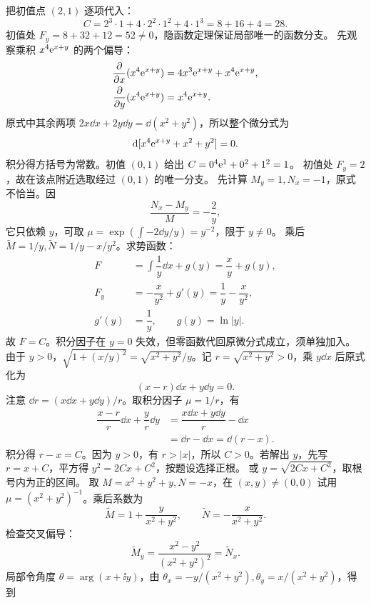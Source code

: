 把初值点 $(2,1)$ 逐项代入：
\[
C=2^3\cdot1+4\cdot2^2\cdot1^2+4\cdot1^3=8+16+4=28.
\]
初值处 $F_y=8+32+12=52\ne0$，隐函数定理保证局部唯一的函数分支。
先观察乘积 $x^4\mathrm e^{x+y}$ 的两个偏导：
\[
\begin{aligned}
\dfrac\partial{\partial x}(x^4\mathrm e^{x+y})&=4x^3\mathrm e^{x+y}+x^4\mathrm e^{x+y},\\
\dfrac\partial{\partial y}(x^4\mathrm e^{x+y})&=x^4\mathrm e^{x+y}.
\end{aligned}
\]
原式中其余两项 $2x\dd x+2y\dd y=\dd(x^2+y^2)$，所以整个微分式为
\[
\mathrm d[x^4\mathrm e^{x+y}+x^2+y^2]=0.
\]
积分得方括号为常数。初值 $(0,1)$ 给出 $C=0^4\mathrm e^1+0^2+1^2=1$。
初值处 $F_y=2$，故在该点附近选取经过 $(0,1)$ 的唯一分支。
先计算 $M_y=1,N_x=-1$，原式不恰当。因
\[
\dfrac{N_x-M_y}{M}=-\dfrac2y,
\]
它只依赖 $y$，可取 $\displaystyle \mu=\exp(\int-2\dd y/y)=y^{-2}$，限于 $y\ne0$。
乘后 $\widetilde M=1/y,\widetilde N=1/y-x/y^2$。求势函数：
\[
\begin{aligned}
F&=\int\dfrac1y\dd x+g(y)=\dfrac xy+g(y),\\
F_y&=-\dfrac{x}{y^2}+g'(y)=\dfrac1y-\dfrac{x}{y^2},\\
g'(y)&=\dfrac1y,\qquad g(y)=\ln|y|.
\end{aligned}
\]
故 $F=C$。积分因子在 $y=0$ 失效，但零函数代回原微分式成立，须单独加入。
由于 $y>0$，$\sqrt{1+(x/y)^2}=\sqrt{x^2+y^2}/y$。记 $r=\sqrt{x^2+y^2}>0$，乘 $y\dd x$ 后原式化为
\[
(x-r)\dd x+y\dd y=0.
\]
注意 $\dd r=(x\dd x+y\dd y)/r$。取积分因子 $\mu=1/r$，有
\[
\begin{aligned}
\dfrac{x-r}{r}\dd x+\dfrac yr\dd y
 &=\dfrac{x\dd x+y\dd y}{r}-\dd x\\
 &=\dd r-\dd x=\dd(r-x).
\end{aligned}
\]
积分得 $r-x=C$。因为 $y>0$，有 $r>|x|$，所以 $C>0$。若解出 $y$，先写 $r=x+C$，平方得 $y^2=2Cx+C^2$，按题设选择正根。
或 $y=\sqrt{2Cx+C^2}$，取根号内为正的区间。
取 $M=x^2+y^2+y,N=-x$，在 $(x,y)\ne(0,0)$ 试用 $\mu=(x^2+y^2)^{-1}$。乘后系数为
\[
\widetilde M=1+\dfrac y{x^2+y^2},\qquad
\widetilde N=-\dfrac x{x^2+y^2}.
\]
检查交叉偏导：
\[
\widetilde M_y=\dfrac{x^2-y^2}{(x^2+y^2)^2}
=\widetilde N_x.
\]
局部令角度 $\theta=\arg(x+\ii y)$，由 $\theta_x=-y/(x^2+y^2),\theta_y=x/(x^2+y^2)$，得到
